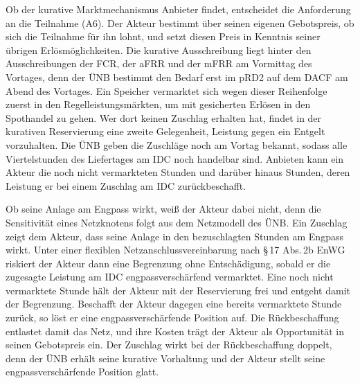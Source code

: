 Ob der kurative Marktmechanismus Anbieter findet, entscheidet die Anforderung an die Teilnahme (A6).
Der Akteur bestimmt über seinen eigenen Gebotspreis, ob sich die Teilnahme für ihn lohnt, und setzt diesen Preis in Kenntnis seiner übrigen Erlösmöglichkeiten.
Die kurative Ausschreibung liegt hinter den Ausschreibungen der \ac{FCR}, der \ac{aFRR} und der \ac{mFRR} am Vormittag des Vortages, denn der \ac{ÜNB} bestimmt den Bedarf erst im pRD2 auf dem \ac{DACF} am Abend des Vortages.
Ein Speicher vermarktet sich wegen dieser Reihenfolge zuerst in den Regelleistungsmärkten, um mit gesicherten Erlösen in den Spothandel zu gehen.
Wer dort keinen Zuschlag erhalten hat, findet in der kurativen Reservierung eine zweite Gelegenheit, Leistung gegen ein Entgelt vorzuhalten.
Die \ac{ÜNB} geben die Zuschläge noch am Vortag bekannt, sodass alle Viertelstunden des Liefertages am \ac{IDC} noch handelbar sind.
Anbieten kann ein Akteur die noch nicht vermarkteten Stunden und darüber hinaus Stunden, deren Leistung er bei einem Zuschlag am \ac{IDC} zurückbeschafft.

Ob seine Anlage am Engpass wirkt, weiß der Akteur dabei nicht, denn die Sensitivität eines Netzknotens folgt aus dem Netzmodell des \ac{ÜNB}.
Ein Zuschlag zeigt dem Akteur, dass seine Anlage in den bezuschlagten Stunden am Engpass wirkt.
Unter einer flexiblen Netzanschlussvereinbarung nach §\,17 Abs.\,2b \ac{EnWG} riskiert der Akteur dann eine Begrenzung ohne Entschädigung, sobald er die zugesagte Leistung am \ac{IDC} engpassverschärfend vermarktet.
Eine noch nicht vermarktete Stunde hält der Akteur mit der Reservierung frei und entgeht damit der Begrenzung.
Beschafft der Akteur dagegen eine bereits vermarktete Stunde zurück, so löst er eine engpassverschärfende Position auf.
Die Rückbeschaffung entlastet damit das Netz, und ihre Kosten trägt der Akteur als Opportunität in seinen Gebotspreis ein.
Der Zuschlag wirkt bei der Rückbeschaffung doppelt, denn der \ac{ÜNB} erhält seine kurative Vorhaltung und der Akteur stellt seine engpassverschärfende Position glatt.

